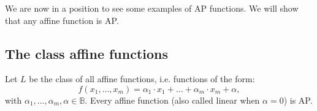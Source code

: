We are now in a position to see some examples of AP functions. We will show that
any affine function is AP.

\subsection{The class affine functions}

\begin{proposition}
  \label{PROPOS:affine_functions_are_wap}
Let $L$ be the class of all affine functions, i.e. functions of the form:
  $$f(x_1,\ldots , x_m)=\alpha_1\cdot x_1+\ldots +\alpha_m\cdot  x_m+\alpha,$$
  with $\alpha_1,\ldots, \alpha_m,\alpha\in \mathbb{B}$. Every affine function
  (also called linear when $\alpha = 0$) is AP.
\end{proposition}

